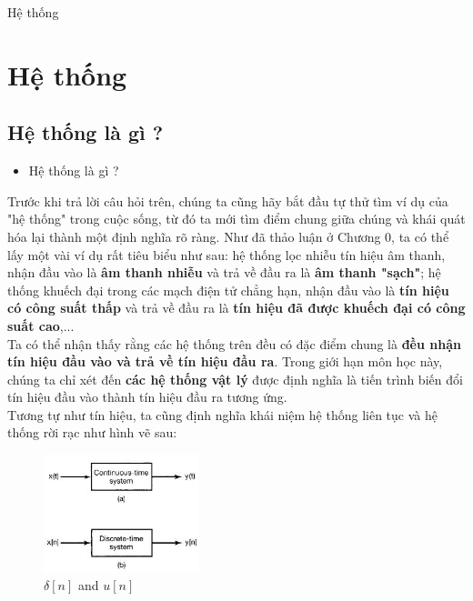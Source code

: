 \documentclass[8pt]{beamer}
\begin{document}
\begin{frame}{Hệ thống}
\section{Hệ thống}
\subsection{Hệ thống là gì ?}
\begin{itemize}
	\item Hệ thống là gì ?
\end{itemize}
 Trước khi trả lời câu hỏi trên, chúng ta cũng hãy bắt đầu tự thử tìm ví dụ của "hệ thống" trong cuộc sống, từ đó ta mới tìm điểm chung giữa chúng và khái quát hóa lại thành một định nghĩa rõ ràng. Như đã thảo luận ở \alert{Chương 0}, ta có thể lấy một vài ví dụ rất tiêu biểu như sau: hệ thống lọc nhiễu tín hiệu âm thanh, nhận đầu vào là \textbf{âm thanh nhiễu} và trả về đầu ra là \textbf{âm thanh "sạch"}; hệ thống khuếch đại trong các mạch điện tử chẳng hạn, nhận đầu vào là \textbf{tín hiệu có công suất thấp} và trả về đầu ra là \textbf{tín hiệu đã được khuếch đại có công suất cao},...
\\ Ta có thể nhận thấy rằng các hệ thống trên đều có đặc điểm chung là \textbf{đều nhận tín hiệu đầu vào và trả về tín hiệu đầu ra}. Trong giới hạn môn học này, chúng ta chỉ xét đến \textbf{các hệ thống vật lý} được định nghĩa là \alert{tiến trình biến đổi tín hiệu đầu vào thành tín hiệu đầu ra tương ứng}.
\\Tương tự như tín hiệu, ta cũng định nghĩa khái niệm \alert{hệ thống liên tục} và \alert{hệ thống rời rạc} như hình vẽ sau:
\begin{figure}[h]
			\includegraphics[width=0.4\textwidth]{system.jpg}
			\caption{$\delta[n]$ and $u[n]$}	\label{fig:re15}
		\end{figure}

\end{frame}
\end{document}
